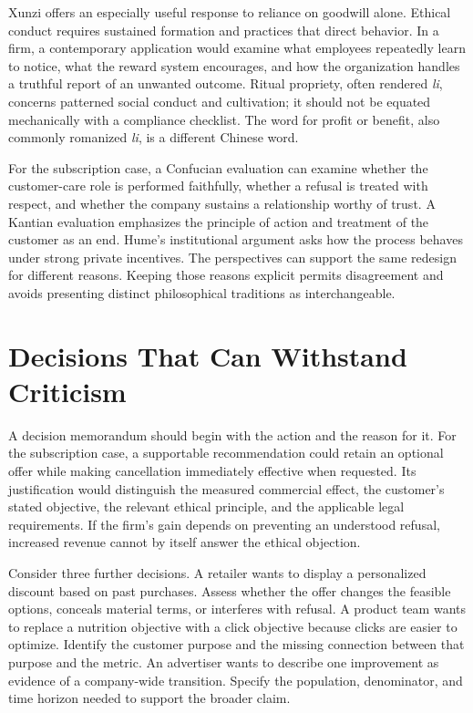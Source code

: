 Xunzi offers an especially useful response to reliance on goodwill
alone. Ethical conduct requires sustained formation and practices that
direct behavior. In a firm, a contemporary application would examine
what employees repeatedly learn to notice, what the reward system
encourages, and how the organization handles a truthful report of an
unwanted outcome. Ritual propriety, often rendered \emph{li}, concerns
patterned social conduct and cultivation; it should not be equated
mechanically with a compliance checklist. The word for profit or
benefit, also commonly romanized \emph{li}, is a different Chinese word.

For the subscription case, a Confucian evaluation can examine whether
the customer-care role is performed faithfully, whether a refusal is
treated with respect, and whether the company sustains a relationship
worthy of trust. A Kantian evaluation emphasizes the principle of action
and treatment of the customer as an end. Hume's institutional argument
asks how the process behaves under strong private incentives. The
perspectives can support the same redesign for different reasons.
Keeping those reasons explicit permits disagreement and avoids
presenting distinct philosophical traditions as interchangeable.


\hypertarget{M09-decisions-that-can-withstand-criticism}{%
\section{Decisions That Can Withstand
Criticism}\label{M09-decisions-that-can-withstand-criticism}}

\noindent \noindent A decision memorandum should begin with the action and the
reason for it. For the subscription case, a supportable recommendation
could retain an optional offer while making cancellation immediately
effective when requested. Its justification would distinguish the
measured commercial effect, the customer's stated objective, the
relevant ethical principle, and the applicable legal requirements. If
the firm's gain depends on preventing an understood refusal, increased
revenue cannot by itself answer the ethical objection.

Consider three further decisions. A retailer wants to display a
personalized discount based on past purchases. Assess whether the offer
changes the feasible options, conceals material terms, or interferes
with refusal. A product team wants to replace a nutrition objective with
a click objective because clicks are easier to optimize. Identify the
customer purpose and the missing connection between that purpose and the
metric. An advertiser wants to describe one improvement as evidence of a
company-wide transition. Specify the population, denominator, and time
horizon needed to support the broader claim.


